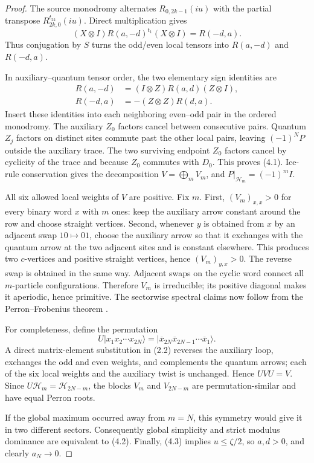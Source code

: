 \documentclass[11pt]{article}
\newcommand{\cH}{\mathcal H}
\begin{document}
\begin{proof}
The source monodromy alternates $R_{0,2k-1}(iu)$ with the partial transpose
$R_{2k,0}^{t_{2k}}(iu)$.  Direct multiplication gives
\[
 (X\otimes I)R(a,-d)^{t_1}(X\otimes I)=R(-d,a).
 \tag{4.4}
\]
Thus conjugation by $S$ turns the odd/even local tensors into $R(a,-d)$ and
$R(-d,a)$.

In auxiliary--quantum tensor order, the two elementary sign identities are
\begin{align}
 R(a,-d)&=(I\otimes Z)R(a,d)(Z\otimes I),\tag{4.5}\\
 R(-d,a)&=-(Z\otimes Z)R(d,a).\tag{4.6}
\end{align}
Insert these identities into each neighboring even--odd pair in the ordered
monodromy.  The auxiliary $Z_0$ factors cancel between consecutive pairs.
Quantum $Z_j$ factors on distinct sites commute past the other local pairs,
leaving $(-1)^N P$ outside the auxiliary trace.  The two surviving endpoint
$Z_0$ factors cancel by cyclicity of the trace and because $Z_0$ commutes with
$D_0$.  This proves (4.1).  Ice-rule conservation gives the decomposition
$V=\bigoplus_mV_m$, and $P|_{\cH_m}=(-1)^m I$.

All six allowed local weights of $V$ are positive.  Fix $m$.  First,
$(V_m)_{x,x}>0$ for every binary word $x$ with $m$ ones: keep the auxiliary
arrow constant around the row and choose straight vertices.  Second, whenever
$y$ is obtained from $x$ by an adjacent swap $10\mapsto01$, choose the
auxiliary arrow so that it exchanges with the quantum arrow at the two
adjacent sites and is constant elsewhere.  This produces two $c$-vertices
and positive straight vertices, hence $(V_m)_{y,x}>0$.  The reverse swap is
obtained in the same way.  Adjacent swaps on the cyclic word connect all
$m$-particle configurations.  Therefore $V_m$ is irreducible; its positive
diagonal makes it aperiodic, hence primitive.  The sectorwise spectral claims
now follow from the Perron--Frobenius theorem \cite[Chapter~8]{HJ}.

For completeness, define the permutation
\[
 U|x_1x_2\cdots x_{2N}\rangle
   =|\overline{x}_{2N}\overline{x}_{2N-1}\cdots\overline{x}_1\rangle.
\]
A direct matrix-element substitution in (2.2) reverses the auxiliary loop,
exchanges the odd and even weights, and complements the quantum arrows; each
of the six local weights and the auxiliary twist is unchanged.  Hence
$UVU=V$.  Since $U\cH_m=\cH_{2N-m}$, the blocks $V_m$ and $V_{2N-m}$ are
permutation-similar and have equal Perron roots.

If the global maximum occurred away from $m=N$, this symmetry would give it
in two different sectors.  Consequently global simplicity and strict modulus
dominance are equivalent to (4.2).  Finally, (4.3) implies $u\leq\zeta/2$,
so $a,d>0$, and clearly $a_N\to0$.
\end{proof}
\end{document}
